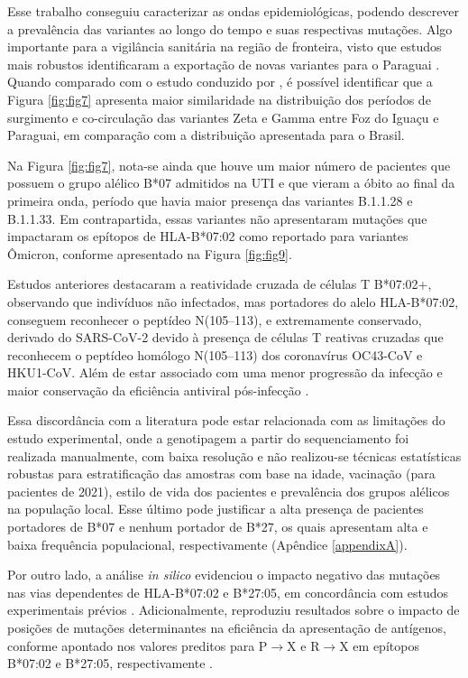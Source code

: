 \begin{justifying}
Esse trabalho conseguiu caracterizar as ondas epidemiológicas, podendo descrever a prevalência das variantes ao longo do tempo e suas respectivas mutações. Algo importante para a vigilância sanitária na região de fronteira, visto que estudos mais robustos identificaram a exportação de novas variantes para o Paraguai \cite{Giovanetti:2022}. Quando comparado com o estudo conduzido por , é possível identificar que a Figura \ref{fig:fig7} apresenta maior similaridade na distribuição dos períodos de surgimento e co-circulação das variantes Zeta e Gamma entre Foz do Iguaçu e Paraguai, em comparação com a distribuição apresentada para o Brasil.

Na Figura \ref{fig:fig7}, nota-se ainda que houve um maior número de pacientes que possuem o grupo alélico B*07 admitidos na UTI e que vieram a óbito ao final da primeira onda, período que havia maior presença das variantes  B.1.1.28 e B.1.1.33. Em contrapartida, essas variantes não apresentaram mutações que impactaram os epítopos de HLA-B*07:02 como reportado para variantes Ômicron, conforme apresentado na Figura \ref{fig:fig9}. 

Estudos anteriores destacaram a reatividade cruzada de células T B*07:02+, observando que indivíduos não infectados, mas portadores do alelo HLA-B*07:02, conseguem reconhecer o peptídeo N(105–113), e extremamente conservado, derivado do SARS-CoV-2 devido à presença de células T reativas cruzadas que reconhecem o peptídeo homólogo N(105–113) dos coronavírus OC43-CoV e HKU1-CoV. Além de estar associado com uma menor progressão da infecção e maior conservação da eficiência antiviral pós-infecção \cite{Francis:2021, Peng:2022}. 

Essa discordância com a literatura pode estar relacionada com as limitações do estudo experimental, onde a genotipagem a partir do sequenciamento foi realizada manualmente, com baixa resolução e não realizou-se técnicas estatísticas robustas para estratificação das amostras com base na idade, vacinação (para pacientes de 2021), estilo de vida dos pacientes e prevalência dos grupos alélicos na população local. Esse último pode justificar a alta presença de pacientes portadores de B*07 e nenhum portador de B*27, os quais apresentam alta e baixa frequência populacional, respectivamente (Apêndice \ref{appendixA}).

Por outro lado, a análise \textit{in silico} evidenciou o impacto negativo das mutações nas vias dependentes de HLA-B*07:02 e B*27:05, em concordância com estudos experimentais prévios \cite{Wellington:2023}. Adicionalmente, reproduziu resultados sobre o impacto de posições de mutações determinantes na eficiência da apresentação de antígenos, conforme apontado nos valores preditos para P$\rightarrow$X e R$\rightarrow$X em epítopos B*07:02 e B*27:05, respectivamente \cite{Hamelin:2022}.


\end{justifying}
